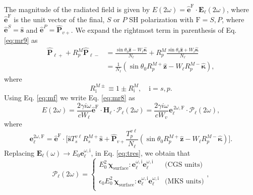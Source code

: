 The magnitude of the radiated field is given by $E(2\omega) =
\hat{\mathbf{e}}^{\mathrm{F}}\cdot\mathbf{E}_{\ell}(2\omega)$, where
$\hat{\mathbf{e}}^{\mathrm{F}}$ is the unit vector of the final, $S$ or $P$ SH
polarization with $\mathrm{F}=S,P$, where $\hat{\mathbf{e}}^S=\hat{\mathbf{s}}$
and $\hat{\mathbf{e}}^P=\hat{\mathbf{P}}_{v+}$. We expand the rightmost term in
parenthesis of Eq. \eqref{eq:mr9} as
\begin{equation}
\begin{split}
\hat{\mathbf{P}}_{\ell +} + R^{M}_{p}\hat{\mathbf{P}}_{\ell -}
&= \frac{\sin\theta_{0}\hat{\mathbf{z}} - W_{\ell}\hat{\boldsymbol{\kappa}}}
        {N_{\ell}}
 + R^{M}_{p}
   \frac{\sin\theta_{0}\hat{\mathbf{z}} + W_{\ell}\hat{\boldsymbol{\kappa}}}
        {N_{\ell}}\\
&= \frac{1}{N_{\ell}}
\left(
\sin\theta_{0}R^{M+}_{p}\hat{\mathbf{z}}
- W_{\ell}R^{M-}_{p}\hat{\boldsymbol{\kappa}}
\right),
\end{split}
\end{equation}
where
\begin{equation}\label{eq:rm}
R^{M\pm}_{\mathrm{i}}\equiv 1 \pm R^{M}_{\mathrm{i}}, \quad \mathrm{i}=s,p.
\end{equation}
Using Eq. \eqref{eq:mf} we write Eq. \eqref{eq:mr8} as
\begin{equation}\label{eq:r10}
E(2\omega) = \frac{2\gamma i\omega}{cW_\ell}
\hat{\mathbf{e}}^{\mathrm{F}}\cdot\mathbf{H}_{\ell}\cdot
\boldsymbol{\mathcal{P}}_{\ell}(2\omega) 
= \frac{2\gamma i\omega}{cW_{v}}
\mathbf{e}^{\,2\omega,\mathrm{F}}_{\ell}\cdot
\boldsymbol{\mathcal{P}}_{\ell}(2\omega),
\end{equation}
where
\begin{equation}\label{eq:r12mm}
\mathbf{e}^{2\omega,\mathrm{F}}_{\ell} =\hat{\mathbf{e}}^{\mathrm{F}}\cdot 
\Bigg[
\hat{\mathbf{s}}T_{s}^{v\ell}R^{M+}_{s}\hat{\mathbf{s}} + 
\hat{\mathbf{P}}_{v+}
\frac{T^{v\ell}_{p}}
     {N_{\ell}}
\left(
\sin\theta_{0}R^{M+}_{p}\hat{\mathbf{z}}
- W_{\ell}R^{M-}_{p}\hat{\boldsymbol{\kappa}}
\right) 
\Bigg]. 
\end{equation}  
Replacing $\mathbf{E}_{\ell}(\omega)\to E_0\mathbf{e}^{\omega,\mathrm{i}}_\ell$,
in Eq. \eqref{eq:tres}, we obtain that
\begin{equation}\label{eq:m4}
\boldsymbol{\mathcal{P}}_{\ell}(2\omega) = 
\left\{
\begin{array}{cc}  
E^{2}_{0}\,
\boldsymbol{\chi}_{\mathrm{surface}}:\mathbf{e}^{\omega,\mathrm{i}}_{\ell}
                  \mathbf{e}^{\omega,\mathrm{i}}_{\ell}
& \text{(CGS units)}\\\\
\epsilon_{0}E^{2}_{0}\,
\boldsymbol{\chi}_{\mathrm{surface}}:\mathbf{e}^{\omega,\mathrm{i}}_{\ell}
                  \mathbf{e}^{\omega,\mathrm{i}}_{\ell}
& \text{(MKS units)}\\
\end{array}
\right.,
\end{equation}
